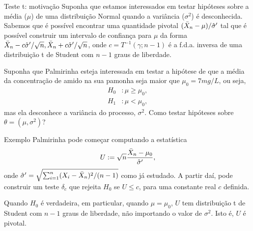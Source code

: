 \begin{frame}{Teste t: motivação}
 Suponha que estamos interessados em testar hipóteses sobre a média ($\mu$) de uma distribuição Normal quando a variância ($\sigma^2$) é desconhecida.
 Sabemos que é possível encontrar uma quantidade pivotal $(\bar{X}_n-\mu)/\hat{\sigma}^\prime$ tal que é possível construir um intervalo de confiança para $\mu$ da forma $\bar{X}_n - c\hat{\sigma}^\prime/\sqrt{n}, \bar{X}_n + c\hat{\sigma}^\prime/\sqrt{n}$, onde $c = T^{-1}(\gamma; n-1)$ é a f.d.a. inversa de uma distribuição t de Student com $n-1$ graus de liberdade.
 
 \begin{pergunta}
 \label{qst:unknown_mean_and_variance}
  Suponha que Palmirinha esteja interessada em testar a hipótese de que a média da concentração de amido na sua pamonha seja maior que $\mu_0 = 7 mg/L$, ou seja,
    \begin{align*}
   H_0 &: \mu \geq \mu_0, \\
   H_1&:  \mu < \mu_0,
  \end{align*}
  mas ela desconhece a variância do processo, $\sigma^2$.
  Como testar hipóteses sobre $\theta = (\mu, \sigma^2)$?
 \end{pergunta} 
\end{frame}

\begin{frame}{Exemplo}
 Palmirinha pode começar computando a estatística 
 \begin{equation*}
  U:= \sqrt{n}\frac{\bar{X}_n-\mu_0}{\hat{\sigma}^\prime},
 \end{equation*}
onde $\hat{\sigma}^\prime = \sqrt{\sum_{i=1}^n (X_i - \bar{X}_n)^2/(n-1)}$ como já estudado.
A partir daí, pode construir um teste $\delta_c$ que rejeita $H_0$ se $U \leq c$, para uma constante real $c$ definida.
\begin{obs}
 Quando $H_0$ é verdadeira, em particular, quando $\mu = \mu_0$, $U$ tem distribuição t de Student com $n-1$ graus de liberdade, não importando o valor de $\sigma^2$.
 Isto é, $U$ é pivotal.
\end{obs}
\end{frame}


